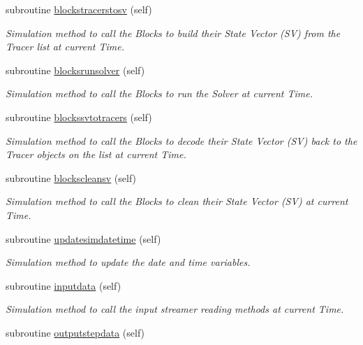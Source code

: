 \begin{DoxyCompactItemize}
subroutine \mbox{\hyperlink{namespacesimulation__mod_a2fbc294996a615647983ec637b83cfc0}{blockstracerstosv}} (self)
\begin{DoxyCompactList}\small\item\em Simulation method to call the Blocks to build their State Vector (SV) from the Tracer list at current Time. \end{DoxyCompactList}\item 
subroutine \mbox{\hyperlink{namespacesimulation__mod_ab2e7a1b0f131ab6fe40454d32cb3e24f}{blocksrunsolver}} (self)
\begin{DoxyCompactList}\small\item\em Simulation method to call the Blocks to run the Solver at current Time. \end{DoxyCompactList}\item 
subroutine \mbox{\hyperlink{namespacesimulation__mod_a5eeea0cb6e0e94c5fd0336a13d635866}{blockssvtotracers}} (self)
\begin{DoxyCompactList}\small\item\em Simulation method to call the Blocks to decode their State Vector (SV) back to the Tracer objects on the list at current Time. \end{DoxyCompactList}\item 
subroutine \mbox{\hyperlink{namespacesimulation__mod_a4cec8fb4baf1b2f69cd2699b0c5b9a55}{blockscleansv}} (self)
\begin{DoxyCompactList}\small\item\em Simulation method to call the Blocks to clean their State Vector (SV) at current Time. \end{DoxyCompactList}\item 
subroutine \mbox{\hyperlink{namespacesimulation__mod_a844f0fae91502f3fc79cc1223f55a86c}{updatesimdatetime}} (self)
\begin{DoxyCompactList}\small\item\em Simulation method to update the date and time variables. \end{DoxyCompactList}\item 
subroutine \mbox{\hyperlink{namespacesimulation__mod_a629f51ee8ca4d2ece7f039a0114b1ef4}{inputdata}} (self)
\begin{DoxyCompactList}\small\item\em Simulation method to call the input streamer reading methods at current Time. \end{DoxyCompactList}\item 
subroutine \mbox{\hyperlink{namespacesimulation__mod_a5735e9ecb39f15061f3d766b0de7809d}{outputstepdata}} (self)

\end{DoxyCompactItemize}
